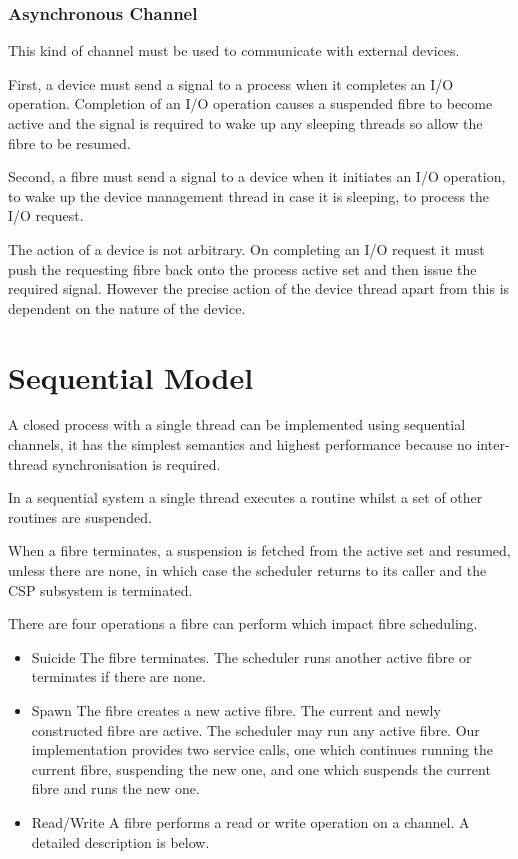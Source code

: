 \documentclass[oneside]{book}
\begin{document}
\subsubsection{Asynchronous Channel}
This kind of channel must be used to communicate with external devices.

First, a device must send a signal to a process when it completes an I/O
operation. Completion of an I/O operation causes a suspended fibre to
become active and the signal is required to wake up any sleeping threads
so allow the fibre to be resumed.

Second, a fibre must send a signal to a device when it initiates
an I/O operation, to wake up the device management thread in
case it is sleeping, to process the I/O request.

The action of a device is not arbitrary. On completing an I/O request
it must push the requesting fibre back onto the process active set
and then issue the required signal. However the precise action
of the device thread apart from this is dependent on the nature
of the device.

\section{Sequential Model}
A closed process with a single thread can be implemented using sequential channels,
it has the simplest semantics and highest performance because no inter-thread synchronisation
is required.

In a sequential system a single thread executes a routine whilst a set of other 
routines are suspended.

When a fibre terminates, a suspension is fetched from the active set and
resumed, unless there are none, in which case the scheduler returns to its caller
and the CSP subsystem is terminated.

There are four operations a fibre can perform which impact fibre scheduling.

\begin{itemize}

\item{Suicide} The fibre terminates. The scheduler runs another active fibre or terminates
if there are none.

\item{Spawn} The fibre creates a new active fibre. The current and newly constructed
fibre are active. The scheduler may run any active fibre. Our implementation provides
two service calls, one which continues running the current fibre, suspending the
new one, and one which suspends the current fibre and runs the new one.

\item{Read/Write} A fibre performs a read or write operation on a channel.
A detailed description is below.

\end{itemize}
\end{document}
